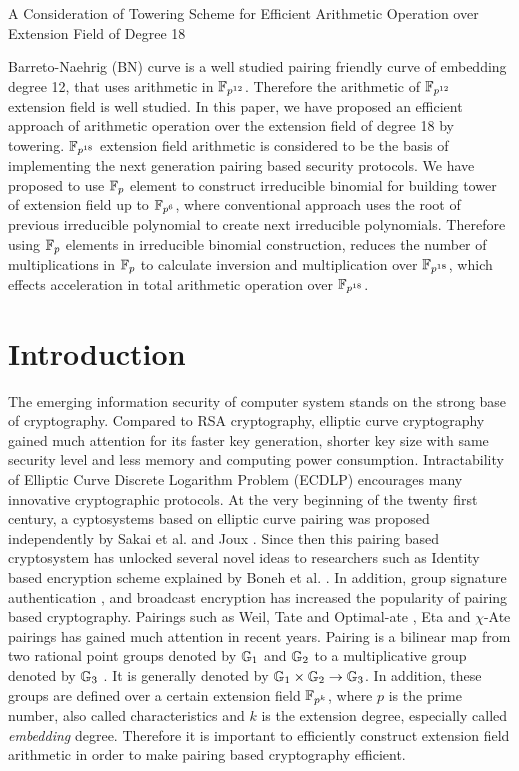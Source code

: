 A Consideration of Towering Scheme for Efficient Arithmetic Operation over Extension Field of Degree 18

Barreto-Naehrig (BN) curve is a well studied pairing friendly curve of embedding degree 12, that uses arithmetic in $\mathbb{F}_{p^{12}}$. Therefore the arithmetic of $\mathbb{F}_{p^{12}}$ extension field is well studied. In this paper, we have proposed an efficient approach of arithmetic operation over the extension field of degree 18 by towering. $\mathbb{F}_{p^{18}}$ extension field arithmetic is considered to be the basis of implementing the next generation pairing based security protocols. We have proposed to use $\mathbb{F}_p$ element to construct irreducible binomial for building tower of extension field up to $\mathbb{F}_{p^6}$, where conventional approach uses the root of previous irreducible polynomial to create next irreducible polynomials. Therefore using $\mathbb{F}_p$ elements in irreducible binomial construction, reduces the number of multiplications in $\mathbb{F}_p$ to calculate inversion and multiplication over $\mathbb{F}_{p^{18}}$, which effects acceleration in total arithmetic operation over $\mathbb{F}_{p^{18}}$.



\section{Introduction}
The emerging information security of computer system stands on the strong base of cryptography. Compared to RSA cryptography, elliptic curve cryptography \cite{koblitz1987elliptic} gained much attention for its faster key generation, shorter key size with same security level and less memory and computing power consumption. Intractability of Elliptic Curve Discrete Logarithm Problem (ECDLP) encourages many innovative cryptographic protocols. At the very beginning of the twenty first century, a cyptosystems based on elliptic curve pairing was proposed independently by Sakai et al. \cite{EPRINT:SakKas03} and Joux \cite{JC:Joux04}. Since then this pairing based cryptosystem has unlocked several novel ideas to researchers such as Identity based encryption scheme explained by Boneh et al. \cite{C:BonFra01}. In addition, group signature authentication \cite{C:BonBoySha04},\cite{AC:NakFun05} and broadcast encryption \cite{C:BonGenWat05} has increased the popularity of pairing based cryptography. Pairings such as Weil\cite{Weil_p}, Tate and Optimal-ate \cite{DBLP:journals/tit/Vercauteren10}, Eta \cite{IEEETIT:HesSmaVer06} and $\chi$-Ate \cite{PAIRING:NASKM08} pairings has gained much attention in recent years. Pairing is a bilinear map from two rational point groups denoted by ${\mathbb{G}}_{1}$ and ${\mathbb{G}}_{2}$ to a multiplicative group denoted by ${\mathbb{G}}_{3}$ \cite{Silverman}. It is generally denoted by ${\mathbb{G}}_{1} \times {\mathbb{G}}_{2} \rightarrow {\mathbb{G}}_{3}$. In addition, these groups are defined over a certain extension field $\mathbb{F}_{p^k}$, where $p$ is the prime number, also called characteristics  and $k$ is the extension degree, especially called \textit{embedding} degree. 
Therefore it is important to efficiently construct extension field arithmetic in order to make pairing based cryptography efficient.

